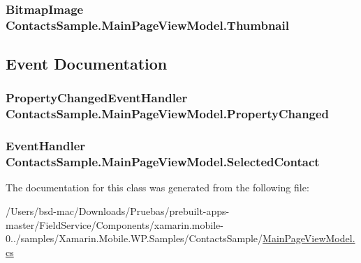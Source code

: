 \hypertarget{class_contacts_sample_1_1_main_page_view_model_aa6b779686582de0f706bab870acc3ebd}{
\subsubsection[{Thumbnail}]{\setlength{\rightskip}{0pt plus 5cm}Bitmap\+Image Contacts\+Sample.\+Main\+Page\+View\+Model.\+Thumbnail\hspace{0.3cm}{\ttfamily [get]}}}\label{class_contacts_sample_1_1_main_page_view_model_aa6b779686582de0f706bab870acc3ebd}


\subsection{Event Documentation}
\hypertarget{class_contacts_sample_1_1_main_page_view_model_a01d924a5942f6d98ffdc2c7b93a62a2f}{
\subsubsection[{Property\+Changed}]{\setlength{\rightskip}{0pt plus 5cm}Property\+Changed\+Event\+Handler Contacts\+Sample.\+Main\+Page\+View\+Model.\+Property\+Changed}}\label{class_contacts_sample_1_1_main_page_view_model_a01d924a5942f6d98ffdc2c7b93a62a2f}
\hypertarget{class_contacts_sample_1_1_main_page_view_model_a0ee559bd8ce93df57d4874195b802a92}{
\subsubsection[{Selected\+Contact}]{\setlength{\rightskip}{0pt plus 5cm}Event\+Handler Contacts\+Sample.\+Main\+Page\+View\+Model.\+Selected\+Contact}}\label{class_contacts_sample_1_1_main_page_view_model_a0ee559bd8ce93df57d4874195b802a92}


The documentation for this class was generated from the following file\+:\begin{DoxyCompactItemize}
\item 
/\+Users/bsd-\/mac/\+Downloads/\+Pruebas/prebuilt-\/apps-\/master/\+Field\+Service/\+Components/xamarin.\+mobile-\/0../samples/\+Xamarin.\+Mobile.\+W\+P.\+Samples/\+Contacts\+Sample/\hyperlink{_contacts_sample_2_main_page_view_model_8cs}{Main\+Page\+View\+Model.\+cs}\end{DoxyCompactItemize}
